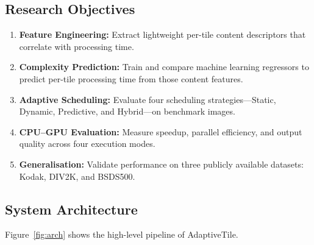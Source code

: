 \documentclass[12pt,a4paper]{article}
\begin{document}
\subsection{Research Objectives}

\begin{enumerate}[leftmargin=*]
  \item \textbf{Feature Engineering:} Extract lightweight per-tile content
        descriptors that correlate with processing time.

  \item \textbf{Complexity Prediction:} Train and compare machine learning regressors
        to predict per-tile processing time from those content features.

  \item \textbf{Adaptive Scheduling:} Evaluate four scheduling strategies---Static,
        Dynamic, Predictive, and Hybrid---on benchmark images.

  \item \textbf{CPU--GPU Evaluation:} Measure speedup, parallel efficiency,
        and output quality across four execution modes.

  \item \textbf{Generalisation:} Validate performance on three publicly available
        datasets: Kodak, DIV2K, and BSDS500.
\end{enumerate}

\subsection{System Architecture}

Figure~\ref{fig:arch} shows the high-level pipeline of AdaptiveTile.
\end{document}
